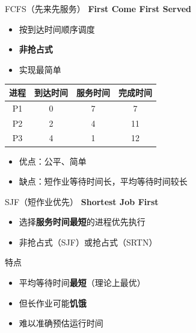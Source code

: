 \documentclass[10pt, aspectratio=169]{beamer}
\begin{document}
\begin{frame}{FCFS（先来先服务）}
    \textbf{First Come First Served}

    \begin{itemize}
        \item 按到达时间顺序调度
        \item \textbf{非抢占式}
        \item 实现最简单
    \end{itemize}
    \vspace{0.5em}
    \begin{tabular}{|c|c|c|c|}
        \hline
        进程 & 到达时间 & 服务时间 & 完成时间 \\
        \hline
        P1 & 0 & 7 & 7 \\
        P2 & 2 & 4 & 11 \\
        P3 & 4 & 1 & 12 \\
        \hline
    \end{tabular}
    \vspace{0.5em}
    \begin{itemize}
        \item 优点：公平、简单
        \item 缺点：短作业等待时间长，平均等待时间较长
    \end{itemize}
\end{frame}

\begin{frame}{SJF（短作业优先）}
    \textbf{Shortest Job First}

    \begin{itemize}
        \item 选择\textbf{服务时间最短}的进程优先执行
        \item 非抢占式（SJF）或抢占式（SRTN）
    \end{itemize}
    \vspace{0.5em}
    \begin{block}{特点}
        \begin{itemize}
            \item 平均等待时间\textbf{最短}（理论上最优）
            \item 但长作业可能\textbf{饥饿}
            \item 难以准确预估运行时间
        \end{itemize}
    \end{block}
\end{frame}
\end{document}
